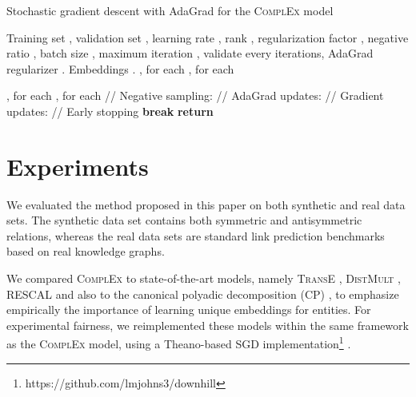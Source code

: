 \documentclass[twoside,11pt]{article}
\renewcommand{\cite}{\citep}
\begin{document}
\begin{algorithm}[H]
\caption{Stochastic gradient descent with AdaGrad for the \textsc{ComplEx} model}
\label{SGDC}
\begin{algorithmic}
\INPUT Training set , validation set , learning rate , rank ,  regularization factor , negative ratio , batch size , maximum iteration , validate every  iterations, AdaGrad regularizer .
\OUTPUT Embeddings .
\STATE  ,  for each 
\STATE ,  for each 

\STATE  ,  for each 
\STATE  ,  for each 
\STATE 
\FOR{}
    \FOR {}
        \STATE // Negative sampling:
        \STATE 
            \FOR{}
                    \STATE  
                \ELSE
                    \STATE  
                \ENDIF
            \ENDFOR
        \ENDFOR
        \STATE 
                \STATE // AdaGrad updates:
                \STATE 
                \STATE // Gradient updates:
                \STATE 
            \ENDFOR
        \ENDFOR
    \ENDFOR
    \STATE // Early stopping
    \IF{}
            \IF{}
                \STATE \textbf{break} 
            \ENDIF
            \STATE 
    \ENDIF
\ENDFOR
\STATE \textbf{return} 
\end{algorithmic}
\end{algorithm}






\section{Experiments}
\label{sec:expe}


We evaluated the method proposed in this paper on both synthetic and real data sets. 
The synthetic data set contains both symmetric and antisymmetric
relations, whereas the real data sets are standard link prediction benchmarks
based on real knowledge graphs. 

We compared \textsc{ComplEx} to state-of-the-art models, namely \textsc{\textsc{TransE}} \cite{bordes2013translating},
\textsc{DistMult} \cite{Yang2015}, RESCAL \cite{Nickel2011} and also to the canonical polyadic decomposition (CP)
\cite{hitchcock-sum-1927}, to emphasize empirically the importance of learning 
unique embeddings for entities. 
For experimental fairness, we reimplemented these models within the same framework as the \textsc{ComplEx} model, using a Theano-based SGD implementation\footnote{https://github.com/lmjohns3/downhill} \cite{theano}. 
\end{document}
